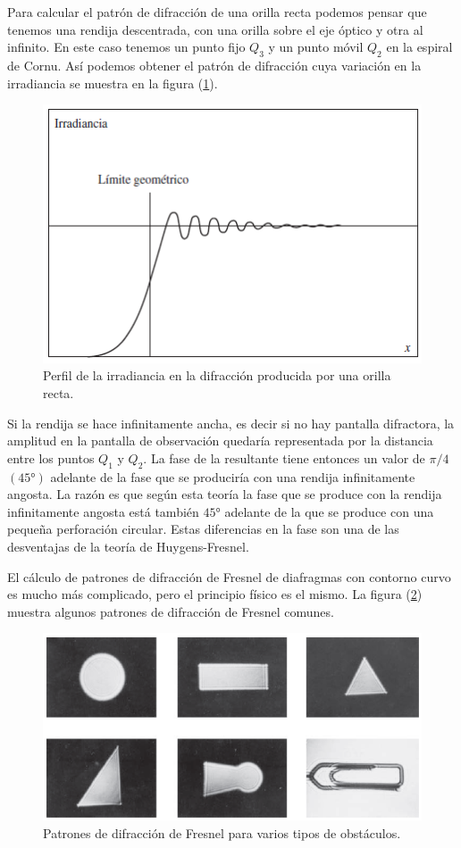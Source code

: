 \documentclass[14pt]{extarticle}
\begin{document}
Para calcular el patrón de difracción de una orilla recta podemos pensar que tenemos una rendija descentrada, con una orilla sobre el eje óptico y otra al infinito. En este caso tenemos un punto fijo $Q_{3}$ y un punto móvil $Q_{2}$ en la espiral de Cornu. Así podemos obtener el patrón de difracción cuya variación en la irradiancia se muestra en la figura (\ref{fig:figura_X_09}).
\begin{figure}[H]
    \centering
    \includegraphics[scale=1]{Imagenes/Difraccion_09.png}
    \caption{Perfil de la irradiancia en la difracción producida por una orilla recta.}
    \label{fig:figura_X_09}
\end{figure}
Si la rendija se hace infinitamente ancha, es decir si no hay pantalla difractora, la amplitud en la pantalla de observación quedaría representada por la distancia entre los puntos $Q_{1}$ y $Q_{2}$. La fase de la resultante tiene entonces un valor de $\pi/4$ $(\ang{45})$ adelante de la fase que se produciría con una rendija infinitamente angosta. La razón es que según esta teoría la fase que se produce con la rendija infinitamente angosta está también $\ang{45}$ adelante de la que se produce con una pequeña perforación circular. Estas diferencias en la fase son una de las desventajas de la teoría de Huygens-Fresnel.
\par
El cálculo de patrones de difracción de Fresnel de diafragmas con contorno curvo es mucho más complicado, pero el principio físico es el mismo. La figura (\ref{fig:figura_X_10}) muestra algunos patrones de difracción de Fresnel comunes.
\begin{figure}[H]
    \centering
    \includegraphics[scale=1]{Imagenes/Difraccion_10.png}
    \caption{Patrones de difracción de Fresnel para varios tipos de obstáculos.}
    \label{fig:figura_X_10}
\end{figure}
\end{document}
